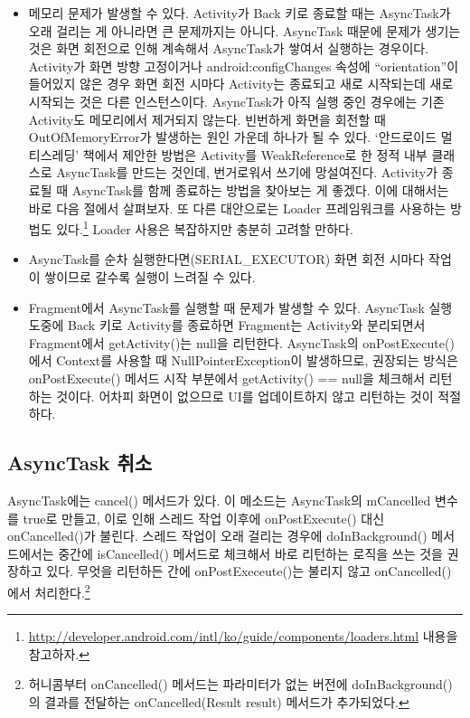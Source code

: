 \begin{itemize}
\item 메모리 문제가 발생할 수 있다. Activity가 Back 키로 종료할 때는 AsyncTask가 오래 걸리는 게 아니라면 큰 문제까지는 아니다. 
AsyncTask 때문에 문제가 생기는 것은 화면 회전으로 인해 계속해서 AsyncTask가 쌓여서 실행하는 경우이다.
Activity가 화면 방향 고정이거나 android:configChanges 속성에 ``orientation''이 들어있지 않은 경우 화면 회전 시마다 Activity는 종료되고 새로 시작되는데 새로 시작되는 것은 다른 인스턴스이다. 
AsyncTask가 아직 실행 중인 경우에는 기존 Activity도 메모리에서 제거되지 않는다. 빈번하게 화면을 회전할 때 OutOfMemoryError가 발생하는 원인 가운데 하나가 될 수 있다.
`안드로이드 멀티스레딩' 책에서 제안한 방법은 Activity를 WeakReference로 한 정적 내부 클래스로 AsyncTask를 만드는 것인데, 번거로워서 쓰기에 망설여진다. Activity가 종료될 때 AsyncTask를 함께 종료하는 방법을 찾아보는 게 좋겠다. 이에 대해서는 바로 다음 절에서 살펴보자.  
또 다른 대안으로는 Loader 프레임워크를 사용하는 방법도 있다.\footnote{\url{http://developer.android.com/intl/ko/guide/components/loaders.html} 내용을 참고하자.}
Loader 사용은 복잡하지만 충분히 고려할 만하다. 

\item AsyncTask를 순차 실행한다면(SERIAL\_EXECUTOR) 화면 회전 시마다 작업이 쌓이므로 갈수록 실행이 느려질 수 있다.

\item Fragment에서 AsyncTask를 실행할 때 문제가 발생할 수 있다. AsyncTask 실행 도중에 Back 키로 Activity를 종료하면 Fragment는 Activity와 분리되면서 Fragment에서 getActivity()는 null을 리턴한다. AsyncTask의 onPostExecute()에서 Context를 사용할 때 NullPointerException이 발생하므로, 권장되는 방식은 onPostExecute() 메서드 시작 부분에서 getActivity() == null을 체크해서 리턴하는 것이다. 어차피 화면이 없으므로 UI를 업데이트하지 않고 리턴하는 것이 적절하다. 
\end{itemize}

\subsection{AsyncTask 취소}
AsyncTask에는 cancel() 메서드가 있다. 이 메소드는 AsyncTask의 mCancelled 변수를 true로 만들고, 이로 인해 스레드 작업 이후에 onPostExecute() 대신 onCancelled()가 불린다. 스레드 작업이 오래 걸리는 경우에 doInBackground() 메서드에서는 중간에 isCancelled() 메서드로 체크해서 바로 리턴하는 로직을 쓰는 것을 권장하고 있다. 무엇을 리턴하든 간에 onPostExeceute()는 불리지 않고 onCancelled()에서 처리한다.\footnote{허니콤부터 onCancelled() 메서드는 파라미터가 없는 버전에 doInBackground()의 결과를 전달하는 onCancelled(Result result) 메서드가 추가되었다.}\\

